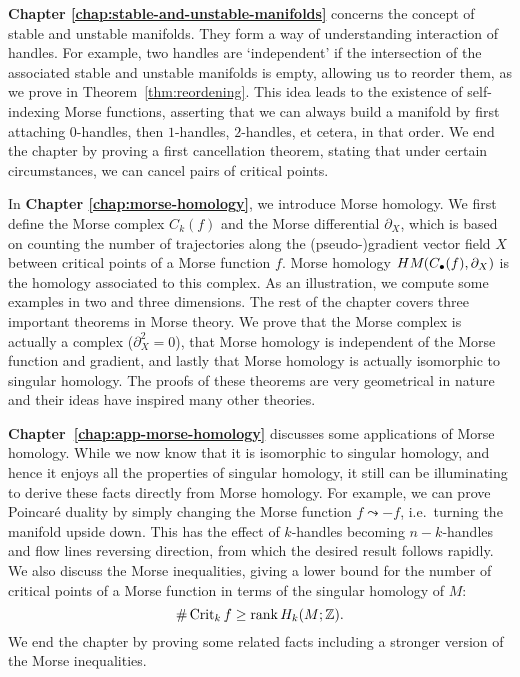 \bigskip

\textbf{Chapter \ref{chap:stable-and-unstable-manifolds}} concerns the concept of stable and unstable manifolds.
They form a way of understanding interaction of handles.
For example, two handles are `independent' if the intersection of the associated stable and unstable manifolds is empty, allowing us to reorder them, as we prove in Theorem~\ref{thm:reordening}.
This idea leads to the existence of self-indexing Morse functions, asserting that we can always build a manifold by first attaching $0$-handles, then $1$-handles, $2$-handles, et cetera, in that order.
We end the chapter by proving a first cancellation theorem, stating that under certain circumstances, we can cancel pairs of critical points.

\bigskip
In \textbf{Chapter \ref{chap:morse-homology}}, we introduce Morse homology.
We first define the Morse complex $C_k(f)$ and the Morse differential $\partial_X$, which is based on counting the number of trajectories along the (pseudo-)gradient vector field $X$ between critical points of a Morse function $f$.
Morse homology $HM_{}(C_\bullet(f), \partial_X)$ is the homology associated to this complex.
As an illustration, we compute some examples in two and three dimensions.
The rest of the chapter covers three important theorems in Morse theory.
We prove that the Morse complex is actually a complex ($\partial_X^2 = 0$), that Morse homology is independent of the Morse function and gradient, and lastly that Morse homology is actually isomorphic to singular homology.
The proofs of these theorems are very geometrical in nature and their ideas have inspired many other theories.

\bigskip
\textbf{Chapter~\ref{chap:app-morse-homology}} discusses some applications of Morse homology.
While we now know that it is isomorphic to singular homology, and hence it enjoys all the properties of singular homology, it still can be illuminating to derive these facts directly from Morse homology.
For example, we can prove Poincaré duality by simply changing the Morse function $f \leadsto -f$, i.e.\ turning the manifold upside down.  This has the effect of $k$-handles becoming $n-k$-handles and flow lines reversing direction, from which the desired result follows rapidly.
We also discuss the Morse inequalities, giving a lower bound for the number of critical points of a Morse function in terms of the singular homology of $M$:
 \[
     \# \operatorname{Crit}_k f \ge \operatorname{rank} H_k(M; \mathbb{Z})
.\] 
We end the chapter by proving some related facts including a stronger version of the Morse inequalities.

